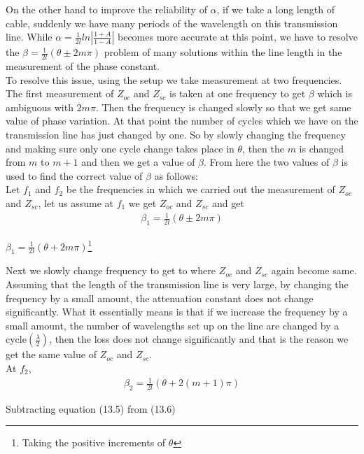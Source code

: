 On the other hand to improve the reliability of $\alpha$, if we take a long length of cable, suddenly we have many periods of the wavelength on this transmission line. While $\alpha = \frac{1}{2l}ln|\frac{1 + A}{1 - A}|$ becomes more accurate at this point, we have to resolve the $\beta = \frac{1}{2l} (\theta \pm 2m\pi)$ problem of many solutions within the line length in the measurement of the phase constant.\\

To resolve this issue, using the setup we take measurement at two frequencies. The first measurement of $Z_{oc}$ and $Z_{sc}$ is taken at one frequency  to get $\beta$ which is ambiguous with $2m\pi$. Then the frequency is changed slowly so that we get same value of phase variation. At  that point the number of cycles which we have on the transmission line has just changed by one. So by slowly changing the frequency and making sure only one cycle change takes place in $\theta$, then the $m$ is changed from $m$ to $m + 1$ and then we get a value of $\beta$. From here the two values of $\beta$ is used to find the correct value of $\beta$ as  follows:
\\Let $f_1$ and $f_2$ be the frequencies in which we carried out the measurement of  $Z_{oc}$ and $Z_{sc}$, let us assume at $f_1$ we get  $Z_{oc}$ and $Z_{sc}$ and get
\begin{align*}
	 \beta_1 = \frac{1}{2l}(\theta \pm 2m\pi)
\end{align*}
\begin{center}
 $\beta_1= \frac{1}{2l}(\theta + 2m\pi)$\footnote{Taking the positive increments of $\theta$}
\end{center}
Next we slowly change frequency to get to where $Z_{oc}$ and $Z_{sc}$ again become same. Assuming that the length of the transmission line is very large, by changing the frequency by a small amount, the attenuation constant does not change significantly. What it essentially means is that if we increase the frequency by a small amount, the number of wavelengths set up on the line are changed by a cycle$(\frac{\lambda}{2})$, then the loss does not change significantly and that is the reason we get the same value of $Z_{oc}$ and $Z_{sc}$.\\At $f_2$,
\begin{align}
 \beta_2 = \frac{1}{2l}(\theta + 2(m + 1)\pi)
 \end{align}
 \begin{center}
 	Subtracting equation (13.5) from (13.6)
 \end{center}
